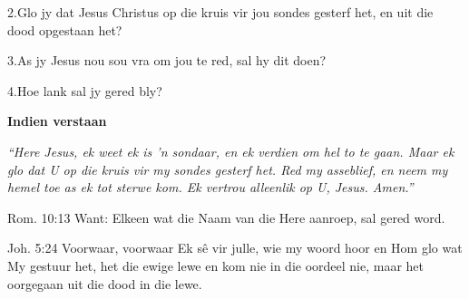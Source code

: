   2.\hspace{0.6em}Glo jy dat Jesus Christus op die kruis vir jou sondes gesterf het, en uit die dood opgestaan het?

  3.\hspace{0.6em}As jy Jesus nou sou vra om jou te red, sal hy dit doen?

  4.\hspace{0.6em}Hoe lank sal jy gered bly?


\textbf{Indien verstaan}

{\em “Here Jesus, ek weet ek is 'n sondaar, en ek verdien om hel to te gaan.  Maar ek glo dat U op die kruis vir my sondes gesterf het.  Red my asseblief, en neem my hemel toe as ek tot sterwe kom.  Ek vertrou alleenlik op U, Jesus.  Amen.” }

Rom. 10:13 Want: Elkeen wat die Naam van die Here aanroep, sal gered word.

Joh. 5:24 Voorwaar, voorwaar Ek sê vir julle, wie my woord hoor en Hom glo wat My gestuur het, het die ewige lewe en kom nie in die oordeel nie, maar het oorgegaan uit die dood in die lewe.

